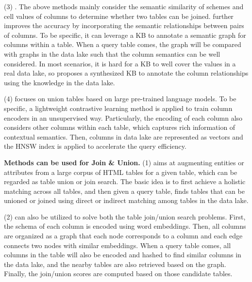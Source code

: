  \noindent  (3) \santos. The above methods mainly consider  the semantic similarity of  schemes and cell values of columns to determine whether two tables can be joined.
   \santos further improves the accuracy by incorporating the semantic relationships between pairs of columns. To be specific,  it can leverage a KB to annotate a semantic graph for columns within a table. When a query table comes, the graph will be compared with graphs in the data lake such that the column semantics can be well considered. In most scenarios, it is hard for a KB to well cover the values in a real data lake, so \santos proposes a synthesized KB to annotate the column relationships using the knowledge in the data lake. 
 


 \noindent (4) \starmie focuses on union tables based on large  pre-trained language models. To be specific, a lightweight contrastive learning method is applied to train column encoders in an unsupervised way. Particularly, the encoding of each column also considers other columns within each table, which captures rich information of contextual semantics.
  Then, columns in data lake are represented as vectors and the HNSW index is applied to accelerate the query efficiency. 


\noindent\textbf{Methods can be used for Join \& Union.}
  (1) \infogather aims at augmenting entities or attributes from a large corpus of HTML tables for a given table, which can be regarded as table union or join search. The basic idea is to first achieve a holistic matching across all tables, and then  given a query table,  \infogather finds tables that can be unioned or joined using direct or indirect matching among tables in the data lake. 

 
  \noindent  (2) \aurum can also be utilized to solve  both the table join/union search problems. First, the schema of each column is encoded using word embeddings. Then, all columns are organized as a graph that each node corresponds to a column and each edge connects two nodes with similar embeddings. When a query table comes, all columns in the table will also be encoded and hashed to find similar columns in the data lake, and  the nearby tables are also retrieved based on the graph. Finally, the join/union scores are computed based on those candidate tables.   
  
